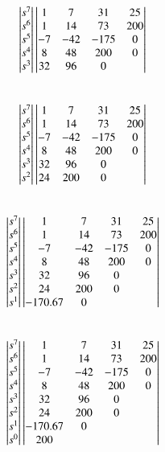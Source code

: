 \begin{enumerate}[label=\thesubsection.\arabic*.,ref=\thesubsection.\theenumi]
\begin{align}
\begin{vmatrix}s^7\\s^6\\s^5\\s^4\\s^3\end{vmatrix}
\begin{vmatrix}1 & 7 & 31 & 25 \\ 1 & 14 & 73 & 200 \\ -7 & -42 & -175 & 0 \\ 8 & 48 & 200 & 0 \\ 32 & 96 & 0 &  \end{vmatrix}
\end{align}\\
\begin{align}
\begin{vmatrix}s^7\\s^6\\s^5\\s^4\\s^3\\s^2\end{vmatrix}
\begin{vmatrix}1 & 7 & 31 & 25 \\ 1 & 14 & 73 & 200 \\ -7 & -42 & -175 & 0 \\ 8 & 48 & 200 & 0 \\ 32 & 96 & 0 &  \\ 24 & 200 & 0 &  \end{vmatrix}
\end{align}\\
\begin{align}
\begin{vmatrix}s^7\\s^6\\s^5\\s^4\\s^3\\s^2\\s^1\end{vmatrix}
\begin{vmatrix}1 & 7 & 31 & 25 \\ 1 & 14 & 73 & 200 \\ -7 & -42 & -175 & 0 \\ 8 & 48 & 200 & 0 \\ 32 & 96 & 0 &  \\ 24 & 200 & 0 &  \\ -170.67 & 0 &  & \end{vmatrix}
\end{align}\\
\begin{align}
\mydet{s^7\\s^6\\s^5\\s^4\\s^3\\s^2\\s^1\\s^0}
\mydet{1 & 7 & 31 & 25 \\ 1 & 14 & 73 & 200 \\ -7 & -42 & -175 & 0 \\ 8 & 48 & 200 & 0 \\ 32 & 96 & 0 &  \\ 24 & 200 & 0 &  \\ -170.67 & 0 &  & \\200 &   &   & }
\label{eq:ee18btech11014_routh_final}
\end{align}


\end{enumerate}
